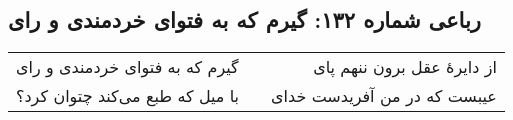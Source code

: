 \begin{center}
\section*{رباعی شماره ۱۳۲: گیرم که به فتوای خردمندی و رای}
\label{sec:132}
\begin{longtable}{l p{0.5cm} r}
گیرم که به فتوای خردمندی و رای
&&
از دایرهٔ عقل برون ننهم پای
\\
با میل که طبع می‌کند چتوان کرد؟
&&
عیبست که در من آفریدست خدای
\\
\end{longtable}
\end{center}
